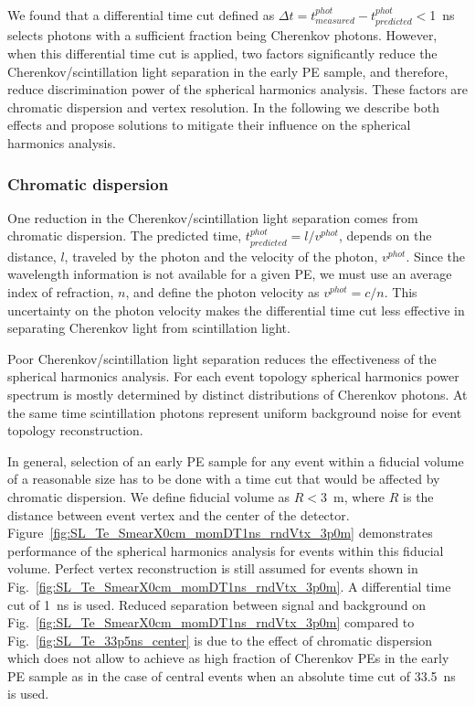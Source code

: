 We found that a differential time cut defined as $\Delta t=t^{phot}_{measured} - t^{phot}_{predicted}<$1~ns selects photons with a 
sufficient fraction being Cherenkov photons. However, when this differential time cut is applied, two factors significantly reduce 
the Cherenkov/scintillation light separation in the early PE sample, and therefore, reduce discrimination power of the spherical 
harmonics analysis. These factors are chromatic dispersion and vertex resolution. In the following we describe both effects and 
propose solutions to mitigate their influence on the spherical harmonics analysis.

\subsubsection{Chromatic dispersion}
One reduction in the Cherenkov/scintillation light separation comes from chromatic dispersion. The predicted time, 
$t^{phot}_{predicted}=l/v^{phot}$, depends on the distance, $l$, traveled by the photon and the velocity of the photon, 
$v^{phot}$.  Since the wavelength information is not available for a given PE, we must use an average index of refraction, $n$, 
and define the photon velocity as $v^{phot} = c/n$. This uncertainty on the photon velocity makes the differential time cut less 
effective in separating Cherenkov light from scintillation light. 

Poor Cherenkov/scintillation light separation reduces the effectiveness of the spherical harmonics analysis. For each event topology 
spherical harmonics power spectrum is mostly determined by distinct distributions of Cherenkov photons. At the same time scintillation 
photons represent uniform background noise for event topology reconstruction.

In general, selection of an early PE sample for any event within a fiducial volume of a reasonable size has to be done with a time
cut that would be affected by chromatic dispersion. We define fiducial volume as $R<3$~m, where $R$ is the distance between event vertex 
and the center of the detector. Figure~\ref{fig:SL_Te_SmearX0cm_momDT1ns_rndVtx_3p0m} demonstrates performance of the spherical 
harmonics analysis for events within this fiducial volume. Perfect vertex reconstruction is still assumed for events shown in 
Fig.~\ref{fig:SL_Te_SmearX0cm_momDT1ns_rndVtx_3p0m}. A differential time cut of 1~ns is used.
Reduced separation between signal and background on Fig.~\ref{fig:SL_Te_SmearX0cm_momDT1ns_rndVtx_3p0m} compared to 
Fig.~\ref{fig:SL_Te_33p5ns_center} is due to the effect of chromatic dispersion which does not allow to achieve as high fraction of 
Cherenkov PEs in the early PE sample as in the case of central events when an absolute time cut of 33.5~ns is used.


